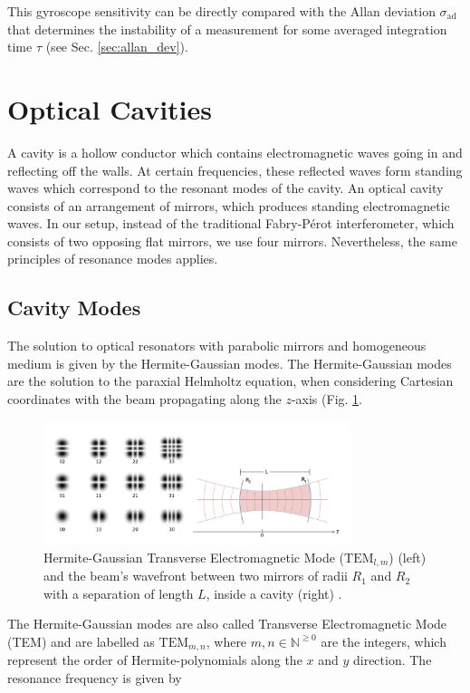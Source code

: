 \documentclass[a4paper]{report}
\numberwithin{equation}{section}
\begin{document}
This gyroscope sensitivity can be directly compared with the Allan deviation $\sigma_{\text{ad}}$ that determines the instability of 
a measurement for some averaged integration time $\tau$ (see Sec. \ref{sec:allan_dev}). 

\section{Optical Cavities}

A cavity is a hollow conductor which contains electromagnetic waves going in and reflecting off the walls. At certain frequencies, these reflected waves form standing waves which correspond to the resonant modes of the cavity. An optical cavity consists of an arrangement of mirrors, which produces standing electromagnetic waves. In our setup, instead of the traditional Fabry-P\'erot interferometer, which consists of two opposing flat mirrors, we use four mirrors. Nevertheless, the same principles of resonance modes applies.

\subsection{Cavity Modes}

The solution to optical resonators with parabolic mirrors and homogeneous medium is given by the Hermite-Gaussian modes. The Hermite-Gaussian modes are the solution to the paraxial Helmholtz equation, when considering Cartesian coordinates with the beam propagating along the $z$-axis (Fig. \ref{fig:hermite}.

\begin{figure}[htpb]
    \centering
    \includegraphics[width=0.8\textwidth]{hermite-gaussian}
	\caption{Hermite-Gaussian Transverse Electromagnetic Mode ($\mathrm{TEM}_{l, m}$) (left) and the beam's wavefront between two mirrors of radii $R_{1}$ and $R_{2}$ with a separation of length $L$, inside a cavity (right) \cite{Groh2021}. }
    \label{fig:hermite}
\end{figure}	

The Hermite-Gaussian modes are also called Transverse Electromagnetic Mode (TEM) and are labelled as $\mathrm{TEM}_{m,n}$, where $m, n \in \mathbb{N}^{\ge 0}$ are the integers, which represent the order of Hermite-polynomials along the $x$ and $y$ direction. The resonance frequency is given by
\end{document}

